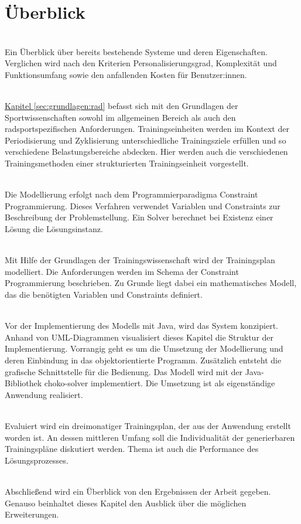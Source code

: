 \section{Überblick}
\label{sec:intro:ueberblick}
\textbf{} \\[0.2em]
Ein Überblick über bereits bestehende Systeme und deren Eigenschaften. Verglichen wird nach den Kriterien Personalisierungsgrad, Komplexität und Funktionsumfang sowie den anfallenden Kosten für Benutzer:innen.

\textbf{} \\[0.2em]
\hyperref[sec:grundlagen:rad]{Kapitel \ref{sec:grundlagen:rad}} befasst sich mit den Grundlagen der Sportwissenschaften sowohl im allgemeinen Bereich als auch den radsportspezifischen Anforderungen. Trainingseinheiten werden im Kontext der Periodisierung und Zyklisierung unterschiedliche Trainingsziele erfüllen und so verschiedene Belastungsbereiche abdecken. Hier werden auch die verschiedenen Trainingsmethoden einer strukturierten Trainingseinheit vorgestellt.

\textbf{} \\[0.2em]
Die Modellierung erfolgt nach dem Programmierparadigma Constraint Programmierung. Dieses Verfahren verwendet Variablen und Constraints zur Beschreibung der Problemstellung. Ein Solver berechnet bei Existenz einer Lösung die Lösungsinstanz. 

\textbf{} \\[0.2em]
Mit Hilfe der Grundlagen der Trainingswissenschaft wird der Trainingsplan modelliert. Die Anforderungen werden im Schema der Constraint Programmierung beschrieben. Zu Grunde liegt dabei ein mathematisches Modell, das die benötigten Variablen und Constraints definiert.

\textbf{} \\[0.2em]
Vor der Implementierung des Modells mit Java, wird das System konzipiert. Anhand von UML-Diagrammen visualisiert dieses Kapitel die Struktur der Implementierung. Vorrangig geht es um die Umsetzung der Modellierung und deren Einbindung in das objektorientierte Programm. Zusätzlich entsteht die grafische Schnittstelle für die Bedienung. Das Modell wird mit der Java-Bibliothek choko-solver implementiert. Die Umsetzung ist als eigenständige Anwendung realisiert. 

\textbf{} \\[0.2em]
Evaluiert wird ein dreimonatiger Trainingsplan, der aus der Anwendung erstellt worden ist. An dessen mittleren Umfang soll die Individualität der generierbaren Trainingspläne diskutiert werden. Thema ist auch die Performance des Lösungsprozesses.

\textbf{} \\[0.2em]
Abschließend wird ein Überblick von den Ergebnissen der Arbeit gegeben. Genauso beinhaltet dieses Kapitel den Ausblick über die möglichen Erweiterungen.
